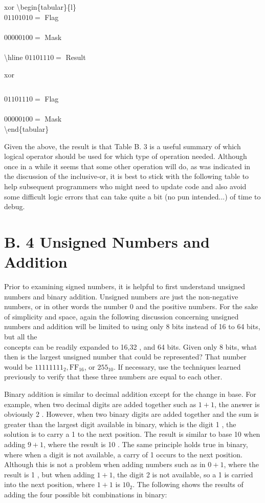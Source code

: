 \documentclass[10pt]{book}
\begin{document}
xor \textbackslash begin\{tabular\}\{l\}\\
$01101010=$ Flag \\
\\
$00000100=$ Mask \\
\\
\textbackslash hline $01101110=$ Result

 xor $\quad$\begin{tabular}{l}
\end{tabular}

$01101110=$ Flag \\
\\
$00000100=$ Mask\\
\textbackslash end\{tabular\}

Given the above, the result is that Table B. 3 is a useful summary of which logical operator should be used for which type of operation needed. Although once in a while it seems that some other operation will do, as was indicated in the discussion of the inclusive-or, it is best to stick with the following table to help subsequent programmers who might need to update code and also avoid some difficult logic errors that can take quite a bit (no pun intended...) of time to debug.

\section*{B. 4 Unsigned Numbers and Addition}
Prior to examining signed numbers, it is helpful to first understand unsigned numbers and binary addition. Unsigned numbers are just the non-negative numbers, or in other words the number 0 and the positive numbers. For the sake of simplicity and space, again the following discussion concerning unsigned numbers and addition will be limited to using only 8 bits instead of 16 to 64 bits, but all the\\
concepts can be readily expanded to 16,32 , and 64 bits. Given only 8 bits, what then is the largest unsigned number that could be represented? That number would be $11111111_{2}, \mathrm{FF}_{16}$, or $255_{10}$. If necessary, use the techniques learned previously to verify that these three numbers are equal to each other.

Binary addition is similar to decimal addition except for the change in base. For example, when two decimal digits are added together such as $1+1$, the answer is obviously 2 . However, when two binary digits are added together and the sum is greater than the largest digit available in binary, which is the digit 1 , the solution is to carry a 1 to the next position. The result is similar to base 10 when adding $9+1$, where the result is 10 . The same principle holds true in binary, where when a digit is not available, a carry of 1 occurs to the next position. Although this is not a problem when adding numbers such as in $0+1$, where the result is 1 , but when adding $1+1$, the digit 2 is not available, so a 1 is carried into the next position, where $1+1$ is $10_{2}$. The following shows the results of adding the four possible bit combinations in binary:
\end{document}
